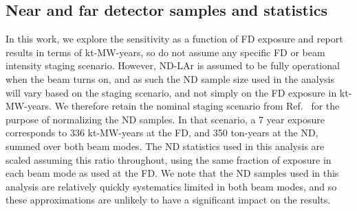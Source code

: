 \subsection{Near and far detector samples and statistics}
In this work, we explore the sensitivity as a function of FD exposure and report results in terms of kt-MW-years, so do not assume any specific FD or beam intensity staging scenario. However, ND-LAr is assumed to be fully operational when the beam turns on, and as such the ND sample size used in the analysis will vary based on the staging scenario, and not simply on the FD exposure in kt-MW-years. We therefore retain the nominal staging scenario from Ref.~\cite{Abi:2020qib} for the purpose of normalizing the ND samples. In that scenario, a 7 year exposure corresponds to 336 kt-MW-years at the FD, and 350 ton-years at the ND, summed over both beam modes. The ND statistics used in this analysis are scaled assuming this ratio throughout, using the same fraction of exposure in each beam mode as used at the FD. We note that the ND samples used in this analysis are relatively quickly systematics limited in both beam modes, and so these approximations are unlikely to have a significant impact on the results.

